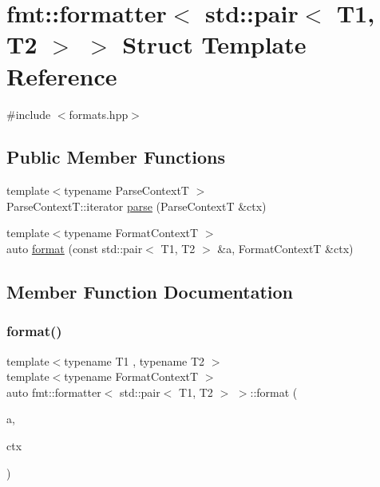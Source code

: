 \hypertarget{structfmt_1_1formatter_3_01std_1_1pair_3_01_t1_00_01_t2_01_4_01_4}{}\section{fmt\+:\+:formatter$<$ std\+:\+:pair$<$ T1, T2 $>$ $>$ Struct Template Reference}
\label{structfmt_1_1formatter_3_01std_1_1pair_3_01_t1_00_01_t2_01_4_01_4}


{\ttfamily \#include $<$formats.\+hpp$>$}

\subsection*{Public Member Functions}
\begin{DoxyCompactItemize}
\item 
{\footnotesize template$<$typename Parse\+ContextT $>$ }\\Parse\+Context\+T\+::iterator \mbox{\hyperlink{structfmt_1_1formatter_3_01std_1_1pair_3_01_t1_00_01_t2_01_4_01_4_a720777838beec8c8c0315b398262e519}{parse}} (Parse\+ContextT \&ctx)
\item 
{\footnotesize template$<$typename Format\+ContextT $>$ }\\auto \mbox{\hyperlink{structfmt_1_1formatter_3_01std_1_1pair_3_01_t1_00_01_t2_01_4_01_4_aabf0a70859e47ab2d65b81658503f4aa}{format}} (const std\+::pair$<$ T1, T2 $>$ \&a, Format\+ContextT \&ctx)
\end{DoxyCompactItemize}


\subsection{Member Function Documentation}
\mbox{\label{structfmt_1_1formatter_3_01std_1_1pair_3_01_t1_00_01_t2_01_4_01_4_aabf0a70859e47ab2d65b81658503f4aa}} 
\subsubsection{\texorpdfstring{format()}{format()}}
{\footnotesize\ttfamily template$<$typename T1 , typename T2 $>$ \\
template$<$typename Format\+ContextT $>$ \\
auto fmt\+::formatter$<$ std\+::pair$<$ T1, T2 $>$ $>$\+::format (\begin{DoxyParamCaption}\item[{const std\+::pair$<$ T1, T2 $>$ \&}]{a,  }\item[{Format\+ContextT \&}]{ctx }\end{DoxyParamCaption})}

